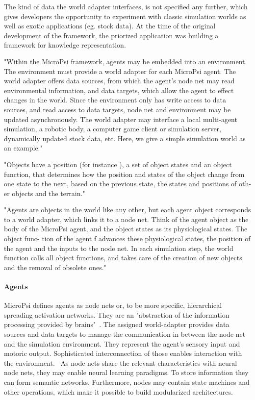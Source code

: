 The kind of data the world adapter interfaces, is not specified any further, which gives developers the opportunity to experiment with classic simulation worlds as well as exotic applications (eg. stock data). At the time of the original development of the framework, the priorized application was building a framework for knowledge representation.~\cite{conf/agi/Bach12}

"Within the MicroPsi framework, agents may be embedded into an environment. The environment must provide a world adapter for each MicroPsi agent. The world adapter offers data sources, from which the agent’s node net may read environmental information, and data targets, which allow the agent to effect changes in the world. Since the environment only has write access to data sources, and read access to data targets, node net and environment may be updated asynchronously.
The world adapter may interface a local multi-agent simulation, a robotic body, a computer game client or simulation server, dynamically updated stock data, etc. Here, we give a simple simulation world as an example."

"Objects have a position (for instance ), a set of object states and an object function, that determines how the position and states of the object change from one state to the next, based on the previous state, the states and positions of oth- er objects and the terrain."

"Agents are objects in the world like any other, but each agent object corresponds to
a world adapter, which links it to a node net. Think of the agent object as the body of
the MicroPsi agent, and the object states as its physiological states. The object func-
tion of the agent f advances these physiological states, the position of the agent
and the inputs to the node net.
In each simulation step, the world function calls all object functions, and takes care
of the creation of new objects and the removal of obsolete ones."

        \paragraph{Agents}    
        
MicroPsi defines agents as node nets or, to be more specific, hierarchical spreading activation networks. They are an "abstraction of the information processing provided by brains"~\cite{conf/agi/Bach12}. The assigned world-adapter provides data sources and data targets to manage the communication in between the node net and the simulation environment. They represent the agent's sensory input and motoric output. Sophisticated interconnection of those enables interaction with the environment.~\cite{conf/agi/Bach12}
As node nets share the relevant characteristics with neural node nets, they may enable neural learning paradigms. To store information they can form semantic networks. Furthermore, nodes may contain state machines and other operations, which make it possible to build modularized architectures.


